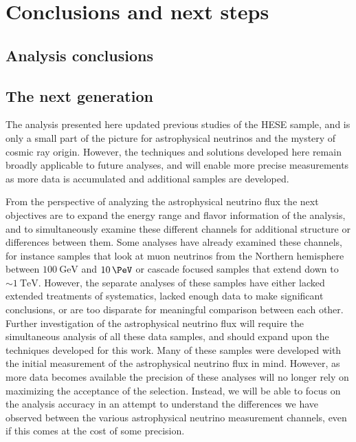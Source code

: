 \chapter{Conclusions and next steps\label{chapter:conclusions}}
\section{Analysis conclusions\label{sec:analysis_conclusions}}
\begingroup
\graphicspath{{results/HESE_Final_Paper/}}

\endgroup
\FloatBarrier

\section{The next generation}
The analysis presented here updated previous studies of the HESE sample, and is only a small part of the picture for astrophysical neutrinos and the mystery of cosmic ray origin.
However, the techniques and solutions developed here remain broadly applicable to future analyses, and will enable more precise measurements as more data is accumulated and additional samples are developed.

From the perspective of analyzing the astrophysical neutrino flux the next objectives are to expand the energy range and flavor information of the analysis, and to simultaneously examine these different channels for additional structure or differences between them.
Some analyses have already examined these channels, for instance samples that look at muon neutrinos from the Northern hemisphere between $\SI{100}\GeV$ and $\SI{10}\PeV$ or cascade focused samples that extend down to $\sim\SI{1}\TeV$.
However, the separate analyses of these samples have either lacked extended treatments of systematics, lacked enough data to make significant conclusions, or are too disparate for meaningful comparison between each other.
Further investigation of the astrophysical neutrino flux will require the simultaneous analysis of all these data samples, and should expand upon the techniques developed for this work.
Many of these samples were developed with the initial measurement of the astrophysical neutrino flux in mind.
However, as more data becomes available the precision of these analyses will no longer rely on maximizing the acceptance of the selection.
Instead, we will be able to focus on the analysis accuracy in an attempt to understand the differences we have observed between the various astrophysical neutrino measurement channels, even if this comes at the cost of some precision.

